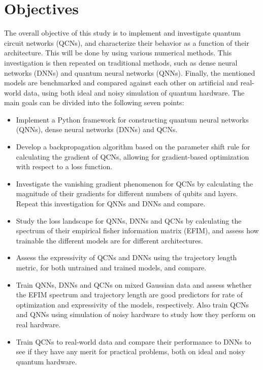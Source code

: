 \section{Objectives}
The overall objective of this study is to implement and investigate quantum circuit networks (QCNs), and characterize their behavior as a function of their architecture. This will be done by using various numerical methods. This investigation is then repeated on traditional methods, such as dense neural networks (DNNs) and quantum neural networks (QNNs). Finally, the mentioned models are benchmarked and compared against each other on artificial and real-world data, using both ideal and noisy simulation of quantum hardware. The main goals can be divided into the following seven points:

\begin{itemize}
    \item Implement a Python framework for constructing quantum neural networks (QNNs), dense neural networks (DNNs) and QCNs.
    
    \item Develop a backpropagation algorithm based on the parameter shift rule for calculating the gradient of QCNs, allowing for gradient-based optimization with respect to a loss function. 
    
    \item Investigate the vanishing gradient phenomenon for QCNs by calculating the magnitude of their gradients for different numbers of qubits and layers. Repeat this investigation for QNNs and DNNs and compare.
    
    \item Study the loss landscape for QNNs, DNNs and QCNs by calculating the spectrum of their empirical fisher information matrix (EFIM), and assess how trainable the different models are for different architectures.
    
    \item Assess the expressivity of QCNs and DNNs using the trajectory length metric, for both untrained and trained models, and compare. 
    
    \item Train QNNs, DNNs and QCNs on mixed Gaussian data and assess whether the EFIM spectrum and trajectory length are good predictors for rate of optimization and expressivity of the models, respectively. Also train QCNs and QNNs using simulation of noisy hardware to study how they perform on real hardware.
    
    \item Train QCNs to real-world data and compare their performance to DNNs to see if they have any merit for practical problems, both on ideal and noisy quantum hardware. 
\end{itemize}